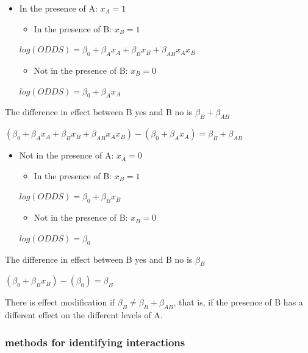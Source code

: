 \documentclass[
]{article}
\providecommand{\tightlist}{%
  \setlength{\itemsep}{0pt}\setlength{\parskip}{0pt}}
\begin{document}
\begin{itemize}
\item
  In the presence of A: \(x_A = 1\)

  \begin{itemize}
  \tightlist
  \item
    In the presence of B: \(x_B = 1\)
  \end{itemize}

  \(log(ODDS) =\beta_0 +\beta_A x_A + \beta_B x_B + \beta_{AB} x_A x_B\)

  \begin{itemize}
  \tightlist
  \item
    Not in the presence of B: \(x_B = 0\)
  \end{itemize}

  \(log(ODDS) =\beta_0 +\beta_A x_A\)
\end{itemize}

The difference in effect between B yes and B no is
\(\beta_B + \beta_{AB}\)

\((\beta_0 +\beta_A x_A + \beta_B x_B + \beta_{AB} x_A x_B) - (\beta_0 +\beta_A x_A ) = \beta_B + \beta_{AB}\)

\begin{itemize}
\item
  Not in the presence of A: \(x_A = 0\)

  \begin{itemize}
  \tightlist
  \item
    In the presence of B: \(x_B = 1\)
  \end{itemize}

  \(log(ODDS) =\beta_0 + \beta_B x_B\)

  \begin{itemize}
  \tightlist
  \item
    Not in the presence of B: \(x_B = 0\)
  \end{itemize}

  \(log(ODDS) =\beta_0\)
\end{itemize}

The difference in effect between B yes and B no is \(\beta_B\)

\((\beta_0 + \beta_B x_B) - (\beta_0) = \beta_B\)

There is effect modification if \(\beta_B \ne \beta_B+ \beta_{AB}\),
that is, if the presence of B has a different effect on the different
levels of A.

\hypertarget{methods-for-identifying-interactions}{%
\subsubsection{methods for identifying
interactions}\label{methods-for-identifying-interactions}}
\end{document}
